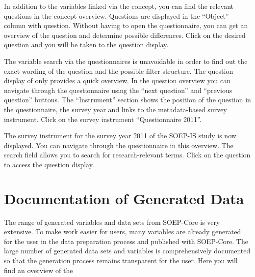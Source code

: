 \documentclass[letterpaper,10pt,openany,onesideH,english]{sphinxmanual}
\begin{document}
In addition to the variables linked via the concept, you can find the relevant questions in the concept overview. Questions are displayed in the “Object” column with question. Without having to open the questionnaire, you can get an overview of the question and determine possible differences. Click on the desired question and you will be taken to the question display.

\begin{figure}[H]
\centering

\noindent{}
\end{figure}

\begin{figure}[H]
\centering

\noindent{}
\end{figure}

 The variable search via the questionnaires is unavoidable in order to find out the exact wording of the question and the possible filter structure. The question display of  only provides a quick overview.
In the question overview you can navigate through the questionnaire using the “next question” and “previous question” buttons. The “Instrument” section shows the position of the question in the questionnaire, the survey year and links to the metadata-based survey instrument. Click on the survey instrument “Questionnaire 2011”.

\begin{figure}[H]
\centering

\noindent{}
\end{figure}

The survey instrument for the survey year 2011 of the SOEP-IS study is now displayed. You can navigate through the questionnaire in this overview. The search field allows you to search for research-relevant terms. Click on the question to access the question display.


\section{Documentation of Generated Data}
\label{\detokenize{Working with SOEP Documentation/index:documentation-of-generated-data}}\label{\detokenize{Working with SOEP Documentation/index:documentation}}
The range of generated variables and data sets from SOEP-Core is very extensive. To make work easier for users, many variables are already generated for the user in the data preparation process and published with SOEP-Core. The large number of generated data sets and variables is comprehensively documented so that the generation process remains transparent for the user. Here you will find an overview of the 
\end{document}
